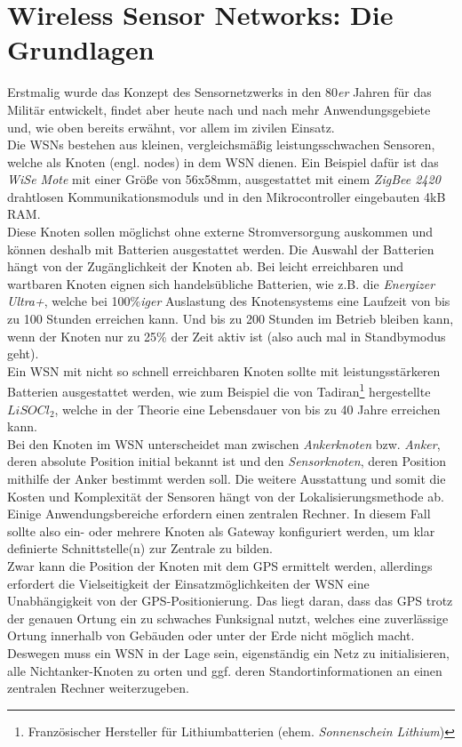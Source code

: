 \documentclass[12pt, a4wide]{scrreprt}
\begin{document}
\chapter{Wireless Sensor Networks: Die Grundlagen}
Erstmalig wurde das Konzept des Sensornetzwerks in den 80\textit{er} Jahren für das Militär entwickelt, findet aber heute nach und nach mehr Anwendungsgebiete und, wie oben bereits erwähnt, vor allem im zivilen Einsatz.\\
\indent
Die WSNs bestehen aus kleinen, vergleichsmäßig leistungsschwachen Sensoren, welche als Knoten (engl. nodes) in dem WSN dienen. Ein Beispiel dafür ist das \textit{WiSe Mote} mit einer Größe von 56x58mm, ausgestattet mit einem \textit{ZigBee 2420} drahtlosen Kommunikationsmoduls und in den Mikrocontroller eingebauten 4kB RAM\cite{WiSe}.\\
\indent
Diese Knoten sollen möglichst ohne externe Stromversorgung auskommen und können deshalb mit Batterien ausgestattet werden. Die Auswahl der Batterien hängt von der Zugänglichkeit der Knoten ab. Bei leicht erreichbaren und wartbaren Knoten eignen sich handelsübliche Batterien, wie z.B. die \textit{Energizer Ultra+}, welche bei 100\%\textit{iger} Auslastung des Knotensystems eine Laufzeit von bis zu 100 Stunden erreichen kann. Und bis zu 200 Stunden im Betrieb bleiben kann, wenn der Knoten nur zu 25\% der Zeit aktiv ist (also auch mal in Standbymodus geht)\cite{lifetime_study}.\\
\indent
Ein WSN mit nicht so schnell erreichbaren Knoten sollte mit leistungsstärkeren Batterien ausgestattet werden, wie zum Beispiel die von Tadiran\footnote{Französischer Hersteller für Lithiumbatterien (ehem. \textit{Sonnenschein Lithium})} hergestellte $LiSOCl_2$, welche in der Theorie eine Lebensdauer von bis zu 40 Jahre erreichen kann.\\
\indent
Bei den Knoten im WSN unterscheidet man zwischen \textit{Ankerknoten} bzw. \textit{Anker}, deren absolute Position initial bekannt ist und den \textit{Sensorknoten}, deren Position mithilfe der Anker bestimmt werden soll. 
Die weitere Ausstattung und somit die Kosten und Komplexität der Sensoren hängt von der Lokalisierungsmethode ab.\\
\indent
Einige Anwendungsbereiche erfordern einen zentralen Rechner. In diesem Fall sollte also ein- oder mehrere Knoten als Gateway konfiguriert werden, um klar definierte Schnittstelle(n) zur Zentrale zu bilden.\\
\indent
Zwar kann die Position der Knoten mit dem GPS ermittelt werden, allerdings erfordert die Vielseitigkeit der Einsatzmöglichkeiten der WSN eine Unabhängigkeit von der GPS-Positionierung. Das liegt daran, dass das GPS trotz der genauen Ortung ein zu schwaches Funksignal nutzt, welches eine zuverlässige  Ortung innerhalb von Gebäuden oder unter der Erde nicht möglich macht. Deswegen muss ein WSN in der Lage sein, eigenständig ein Netz zu initialisieren, alle Nichtanker-Knoten zu orten und ggf. deren Standortinformationen an einen zentralen Rechner weiterzugeben.
\end{document}
